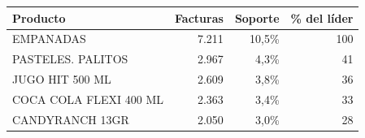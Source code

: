 \begin{tabular}{lrrr}
\toprule
\textbf{Producto} & \textbf{Facturas} & \textbf{Soporte} & \textbf{\% del líder} \\
\midrule
EMPANADAS & 7.211 & 10,5\% & 100 \\
PASTELES. PALITOS & 2.967 & 4,3\% & 41 \\
JUGO HIT 500 ML & 2.609 & 3,8\% & 36 \\
COCA COLA FLEXI 400 ML & 2.363 & 3,4\% & 33 \\
CANDYRANCH 13GR & 2.050 & 3,0\% & 28 \\
\bottomrule
\end{tabular}
